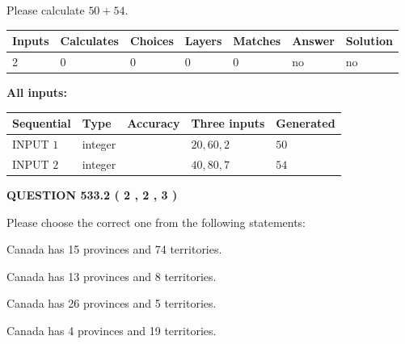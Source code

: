 \documentclass[12pt]{article}
\begin{document}
  
 
Please calculate $ %
50 +  %
54 $.
 
 
   
   
   
   
\noindent\begin{tabular}{|l|l|l|l|l|l|l|}
 \hline
Inputs & Calculates & Choices & Layers & Matches & Answer & Solution \\ \hline
 2  & 
 0  & 
 0
  & 
 0  & 
 0  & 
  no & 
  no 
  \\ \hline
 \end{tabular}
   
   
   
   
\noindent{}
   
   
   
   
\noindent\vspace{0.1in}\hspace{-0.08in} {\textbf{\Large{All inputs: }}}
   
   
  
  
\noindent\begin{tabular}{|l|l|l|l|l|}
\hline
 Sequential & Type & Accuracy & Three inputs & Generated \\ 
\hline
 
 
  INPUT $  1 $ & integer &  & $
 20
 , 
 60
 , 
 2
 $ & $ 50 $ 
 \\  \hline  
 
 
  INPUT $  2 $ & integer &  & $
 40
 , 
 80
 , 
 7
 $ & $ 54 $ 
 \\  \hline  
 \end{tabular}
   
   
  
\vspace{0.2in}
  
{\textbf{\Large{QUESTION
533.2 
 ( 2 , 2 , 3 )
}}}
  
  
Please choose the correct one from the following statements:
 
 
Canada has  15 provinces and  74 territories.
 
 
Canada has  13 provinces and  8 territories.
 
 
Canada has  26 provinces and  5 territories.
 
 
Canada has   4 provinces and  19 territories.
 
\end{document}
